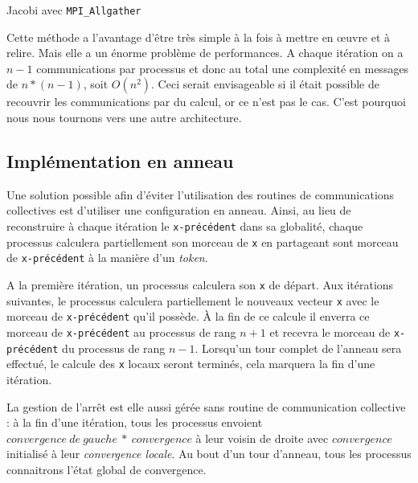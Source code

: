 \documentclass[a4paper]{article}
\begin{document}
\begin{algorithm}[H]
 \SetLine %
 
 \caption{\label{jacnaif}Jacobi avec \texttt{MPI\_Allgather}}
\end{algorithm}


Cette méthode a l'avantage d'être très simple à la fois à mettre
en \oe uvre et à relire. Mais elle a un énorme problème de
performances. A chaque itération on a $n - 1$ communications par
processus et donc au total une complexité en messages de $n*(n - 1)$,
soit $O(n^2)$. Ceci serait envisageable si il était possible de
recouvrir les communications par du calcul, or ce n'est pas le
cas. C'est pourquoi nous nous tournons vers une autre architecture.

\subsection{Implémentation en anneau}
Une solution possible afin d'éviter l'utilisation des routines de communications 
collectives est d'utiliser une configuration en anneau. Ainsi, au lieu de
reconstruire à chaque itération le \texttt{x-précédent} dans sa globalité, 
chaque processus calculera partiellement son morceau de \texttt{x} en partageant 
sont morceau de \texttt{x-précédent} à la manière d'un \emph{token}. 

A la première itération, un processus calculera son \texttt{x} de départ. Aux
itérations suivantes, le processus calculera partiellement le nouveaux vecteur
\texttt{x} avec le morceau de \texttt{x-précédent} qu'il possède. À la fin de 
ce calcule il enverra ce morceau de \texttt{x-précédent} au processus de rang
$n + 1$ et recevra le morceau de \texttt{x-précédent} du processus de rang
$n - 1$. Lorsqu'un tour complet de l'anneau sera effectué, le calcule des 
\texttt{x} locaux seront terminés, cela marquera la fin d'une itération.

La gestion de l'arrêt est elle aussi gérée sans routine de communication 
collective : à la fin d'une itération, tous les processus envoient 
$convergence~de~gauche~*~convergence$ à leur voisin de droite avec $convergence$
initialisé à leur \emph{convergence locale}. Au bout d'un tour d'anneau, tous
les processus connaitrons l'état global de convergence.\\
\end{document}
